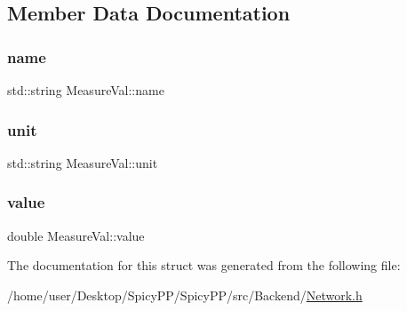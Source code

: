 \subsection{Member Data Documentation}
\mbox{\label{structMeasureVal_a9f56f01e20f665558fb0fd68bd2f1dd1}} 
\subsubsection{\texorpdfstring{name}{name}}
{\footnotesize\ttfamily std\+::string Measure\+Val\+::name}

\mbox{\label{structMeasureVal_a1510e76f94aac1d2c563f6559cdf7fee}} 
\subsubsection{\texorpdfstring{unit}{unit}}
{\footnotesize\ttfamily std\+::string Measure\+Val\+::unit}

\mbox{\label{structMeasureVal_a4fe869c645268312381b156ac1b42683}} 
\subsubsection{\texorpdfstring{value}{value}}
{\footnotesize\ttfamily double Measure\+Val\+::value}



The documentation for this struct was generated from the following file\+:\begin{DoxyCompactItemize}
\item 
/home/user/\+Desktop/\+Spicy\+P\+P/\+Spicy\+P\+P/src/\+Backend/\hyperlink{Network_8h}{Network.\+h}\end{DoxyCompactItemize}
